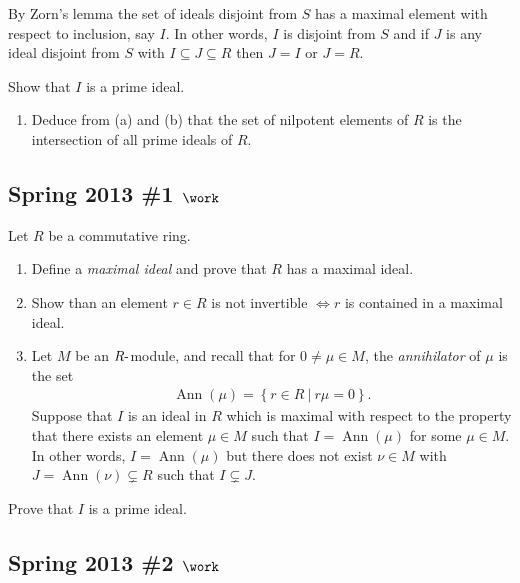 By Zorn's lemma the set of ideals disjoint from \(S\) has a maximal
element with respect to inclusion, say \(I\). In other words, \(I\) is
disjoint from \(S\) and if \(J\) is any ideal disjoint from \(S\) with
\(I\subseteq J \subseteq R\) then \(J=I\) or \(J=R\).

Show that \(I\) is a prime ideal.

\begin{enumerate}
\def\labelenumi{\alph{enumi}.}
\setcounter{enumi}{3}
\tightlist
\item
  Deduce from (a) and (b) that the set of nilpotent elements of \(R\) is
  the intersection of all prime ideals of \(R\).
\end{enumerate}

\hypertarget{spring-2013-1-work}{%
\subsection{\texorpdfstring{Spring 2013 \#1
\(\work\)}{Spring 2013 \#1 \textbackslash work}}\label{spring-2013-1-work}}

Let \(R\) be a commutative ring.

\begin{enumerate}
\def\labelenumi{\alph{enumi}.}
\item
  Define a \emph{maximal ideal} and prove that \(R\) has a maximal
  ideal.
\item
  Show than an element \(r\in R\) is not invertible \(\iff r\) is
  contained in a maximal ideal.
\item
  Let \(M\) be an \(R{\hbox{-}}\)module, and recall that for
  \(0\neq \mu \in M\), the \emph{annihilator} of \(\mu\) is the set
  \begin{align*}
  \operatorname{Ann}(\mu) = \left\{{r\in R {~\mathrel{\Big|}~}r\mu = 0}\right\}
  .\end{align*}
  Suppose that \(I\) is an ideal in \(R\) which is maximal with respect
  to the property that there exists an element \(\mu \in M\) such that
  \(I = \operatorname{Ann}(\mu)\) for some \(\mu \in M\). In other
  words, \(I = \operatorname{Ann}(\mu)\) but there does not exist
  \(\nu\in M\) with \(J = \operatorname{Ann}(\nu) \subsetneq R\) such
  that \(I\subsetneq J\).
\end{enumerate}

Prove that \(I\) is a prime ideal.

\hypertarget{spring-2013-2-work}{%
\subsection{\texorpdfstring{Spring 2013 \#2
\(\work\)}{Spring 2013 \#2 \textbackslash work}}\label{spring-2013-2-work}}

